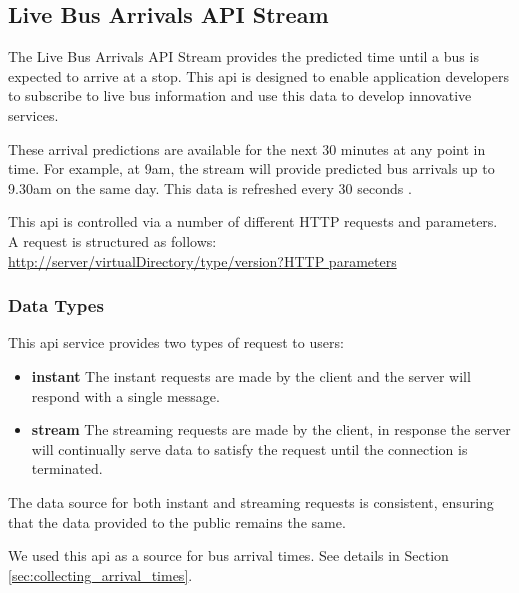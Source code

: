\subsection{Live Bus Arrivals API Stream}
\par The Live Bus Arrivals API Stream provides the predicted time until a bus is expected to arrive at a stop. This \acrshort{api} is designed to enable application developers to subscribe to live bus information and use this data to develop innovative services\cite{live_bus_api_documentation}.

\par These arrival predictions are available for the next 30 minutes at any point in time. For example, at 9am, the stream will provide predicted bus arrivals up to 9.30am on the same day. This data is refreshed every 30 seconds \cite{live_bus_api_documentation}.

\par This \acrshort{api} is controlled via a number of different HTTP requests and parameters. A request is structured as follows: \\
\url{http://server/virtualDirectory/type/version?HTTP parameters}

\subsubsection{Data Types}

\par This \acrshort{api} service provides two types of request to users:

\begin{itemize}
  \item \textbf{instant} The instant requests are made by the client and the server will respond with a single message.
  \item \textbf{stream} The streaming requests are made by the client, in response the server will continually serve data to satisfy the request until the connection is terminated.
\end{itemize}

\par The data source for both instant and streaming requests is consistent, ensuring that the data provided to the public remains the same.

\par We used this \acrshort{api} as a source for bus arrival times. See details in Section \ref{sec:collecting_arrival_times}.



